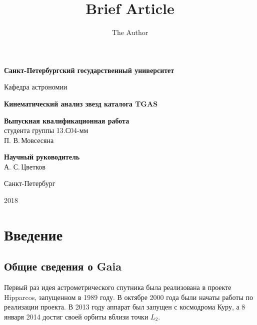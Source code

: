 \documentclass[14pt]{article} %
\title{Brief Article}
\author{The Author}
\begin{document}
\begin{titlepage}

\begin{center}
{\small \bf Санкт-Петербургский государственный университет

Кафедра астрономии}
\end{center}

\vspace{2cm}
\begin{center}
  \large{\bf Кинематический анализ звезд каталога TGAS}
 \end{center}

\vspace{3cm}

\hspace{8cm}\parbox{8cm}{	%

\footnotesize{{\bf Выпускная квалификационная работа}\\
студента группы 13.С04-мм\\
П. В.\,Мовсесяна}  %

\vspace{1cm}

{\bf Научный руководитель}\\
А. С.\,Цветков \\  %
}


\vfill %

\begin{center}
\small {Санкт-Петербург

2018}
\end{center}

\end{titlepage}

\tableofcontents
\newpage

\section{Введение}
\subsection{Общие сведения о Gaia}
Первый раз идея астрометрического спутника была реализована в проекте Hipparcos, запущенном в 1989 году. В октябре 2000 года были начаты работы по реализации проекта. В 2013 году аппарат был запущен с космодрома Куру, а 8 января 2014 достиг своей орбиты вблизи точки $L_2$.
\end{document}
